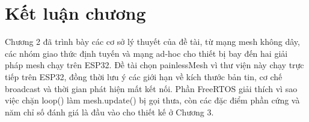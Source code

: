 \section{Kết luận chương}

Chương 2 đã trình bày các cơ sở lý thuyết của đề tài, từ mạng mesh không dây, các nhóm giao thức định tuyến và mạng ad-hoc cho thiết bị bay đến hai giải pháp mesh chạy trên ESP32. Đề tài chọn painlessMesh vì thư viện này chạy trực tiếp trên ESP32, đồng thời lưu ý các giới hạn về kích thước bản tin, cơ chế broadcast và thời gian phát hiện mất kết nối. Phần FreeRTOS giải thích vì sao việc chặn loop() làm mesh.update() bị gọi thưa, còn các đặc điểm phần cứng và năm chỉ số đánh giá là đầu vào cho thiết kế ở Chương 3.
